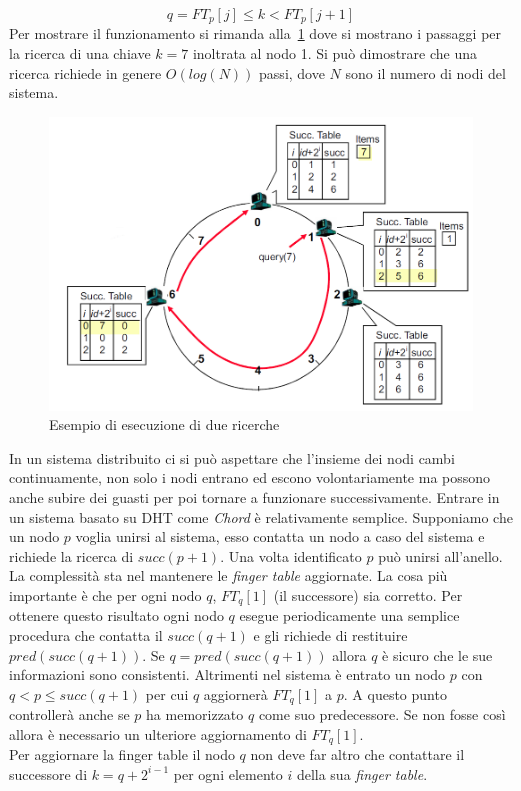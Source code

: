 $$q = FT_p[j]\leq k < FT_p[j+1]$$
Per mostrare il funzionamento si rimanda alla \figurename\,\ref{img:chordexe} dove si mostrano i passaggi per la ricerca di una chiave $k = 7$ inoltrata al nodo 1.
Si può dimostrare che una ricerca richiede in genere $O(log(N))$ passi, dove $N$ sono il numero di nodi del sistema.\\
\begin{figure}
\centering
\includegraphics[scale=0.5]{img/chordexe.png}
\caption{Esempio di esecuzione di due ricerche}\label{img:chordexe}
\end{figure}
In un sistema distribuito ci si può aspettare che l'insieme dei nodi cambi continuamente, non solo i nodi entrano ed escono volontariamente ma possono anche subire dei guasti per poi tornare a funzionare successivamente.
Entrare in un sistema basato su DHT come \emph{Chord} è relativamente semplice. Supponiamo che un nodo $p$ voglia unirsi al sistema, esso contatta un nodo a caso del sistema e richiede la ricerca di $succ(p+1)$. Una volta identificato $p$ può unirsi all'anello. La complessità sta nel mantenere le \emph{finger table} aggiornate. La cosa più importante è che per ogni nodo $q$, $FT_q[1]$ (il successore) sia corretto. Per ottenere questo risultato ogni nodo $q$ esegue periodicamente una semplice procedura che contatta il $succ(q+1)$ e gli richiede di restituire $pred(succ(q+1))$. Se $q=pred(succ(q+1))$ allora $q$ è sicuro che le sue informazioni sono consistenti. Altrimenti nel sistema è entrato un nodo $p$ con $q<p\leq succ(q+1)$ per cui $q$ aggiornerà $FT_q[1]$ a $p$. A questo punto controllerà anche se $p$ ha memorizzato $q$ come suo predecessore. Se non fosse così allora è necessario un ulteriore aggiornamento di $FT_q[1]$.\\
Per aggiornare la finger table il nodo $q$ non deve far altro che contattare il successore di $k = q+2^{i-1}$ per ogni elemento $i$ della sua \emph{finger table}.
